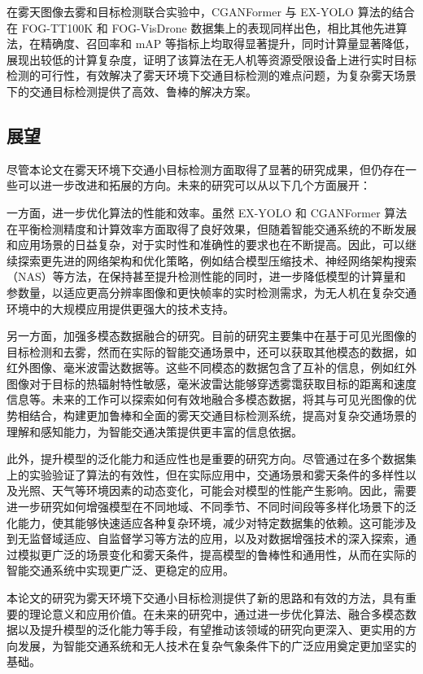 在雾天图像去雾和目标检测联合实验中，CGANFormer 与 EX-YOLO 算法的结合在 FOG-TT100K 和 FOG-VisDrone 数据集上的表现同样出色，相比其他先进算法，在精确度、召回率和 mAP 等指标上均取得显著提升，同时计算量显著降低，展现出较低的计算复杂度，证明了该算法在无人机等资源受限设备上进行实时目标检测的可行性，有效解决了雾天环境下交通目标检测的难点问题，为复杂雾天场景下的交通目标检测提供了高效、鲁棒的解决方案。


\subsection{展望}

尽管本论文在雾天环境下交通小目标检测方面取得了显著的研究成果，但仍存在一些可以进一步改进和拓展的方向。未来的研究可以从以下几个方面展开：

一方面，进一步优化算法的性能和效率。虽然 EX-YOLO 和 CGANFormer 算法在平衡检测精度和计算效率方面取得了良好效果，但随着智能交通系统的不断发展和应用场景的日益复杂，对于实时性和准确性的要求也在不断提高。因此，可以继续探索更先进的网络架构和优化策略，例如结合模型压缩技术、神经网络架构搜索（NAS）等方法，在保持甚至提升检测性能的同时，进一步降低模型的计算量和参数量，以适应更高分辨率图像和更快帧率的实时检测需求，为无人机在复杂交通环境中的大规模应用提供更强大的技术支持。

另一方面，加强多模态数据融合的研究。目前的研究主要集中在基于可见光图像的目标检测和去雾，然而在实际的智能交通场景中，还可以获取其他模态的数据，如红外图像、毫米波雷达数据等。这些不同模态的数据包含了互补的信息，例如红外图像对于目标的热辐射特性敏感，毫米波雷达能够穿透雾霭获取目标的距离和速度信息等。未来的工作可以探索如何有效地融合多模态数据，将其与可见光图像的优势相结合，构建更加鲁棒和全面的雾天交通目标检测系统，提高对复杂交通场景的理解和感知能力，为智能交通决策提供更丰富的信息依据。

此外，提升模型的泛化能力和适应性也是重要的研究方向。尽管通过在多个数据集上的实验验证了算法的有效性，但在实际应用中，交通场景和雾天条件的多样性以及光照、天气等环境因素的动态变化，可能会对模型的性能产生影响。因此，需要进一步研究如何增强模型在不同地域、不同季节、不同时间段等多样化场景下的泛化能力，使其能够快速适应各种复杂环境，减少对特定数据集的依赖。这可能涉及到无监督域适应、自监督学习等方法的应用，以及对数据增强技术的深入探索，通过模拟更广泛的场景变化和雾天条件，提高模型的鲁棒性和通用性，从而在实际的智能交通系统中实现更广泛、更稳定的应用。

本论文的研究为雾天环境下交通小目标检测提供了新的思路和有效的方法，具有重要的理论意义和应用价值。在未来的研究中，通过进一步优化算法、融合多模态数据以及提升模型的泛化能力等手段，有望推动该领域的研究向更深入、更实用的方向发展，为智能交通系统和无人技术在复杂气象条件下的广泛应用奠定更加坚实的基础。
